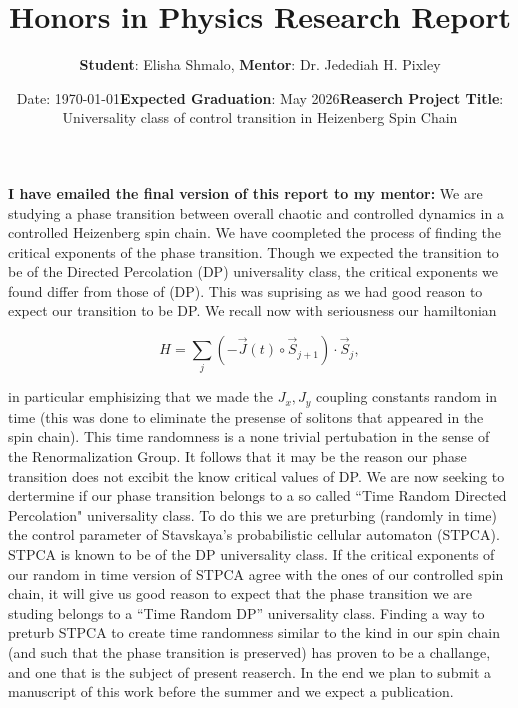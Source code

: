 \documentclass[12pt]{article}
\title{\textbf{Honors in Physics Research Report}}
\author{\textbf{Student}: Elisha Shmalo, \textbf{Mentor}: Dr. Jedediah H. Pixley}
\date{Date: \today}
\date{\textbf{Expected Graduation}: May 2026}
\date{\textbf{Reaserch Project Title}: Universality class of control transition in Heizenberg Spin Chain}
\numberwithin{equation}{section}
\begin{document}
\maketitle

\textbf{I have emailed the final version of this report to my mentor:} We are studying a phase transition between overall 
chaotic and controlled dynamics in a controlled Heizenberg spin chain. We have coompleted the process of 
finding the critical exponents of the phase transition. Though we expected the transition to be of the Directed Percolation (DP)
universality class, the critical exponents we found differ from those of (DP). This was suprising as we had 
good reason to expect our transition to be DP. We recall now with seriousness our hamiltonian

\begin{equation}
    H = \sum_j (-\vec{J}(t) \circ \vec{S}_{j+1}) \cdot \vec{S}_j,
\end{equation}

in particular emphisizing that we made the $J_x, J_y$ coupling constants random in time (this was done to eliminate the 
presense of solitons that appeared in the spin chain). This time randomness is a none trivial pertubation in the 
sense of the Renormalization Group. It follows that it may be the reason our phase transition does not excibit the 
know critical values of DP. We are now seeking to dertermine 
if our phase transition belongs to a so called ``Time Random Directed Percolation" universality class. To do this we are 
preturbing (randomly in time) the control parameter of Stavskaya's probabilistic cellular automaton (STPCA). STPCA is known to 
be of the DP universality class. If the critical exponents of our random in time version of STPCA agree with the ones of 
our controlled spin chain, it will give us good reason to expect that the phase transition we are studing belongs to a 
``Time Random DP'' universality class. Finding a way to preturb STPCA to create time randomness similar to the kind in 
our spin chain (and such that the phase transition is preserved) has proven to be a challange, and one that is the subject of present reaserch.
In the end we plan to submit a manuscript of this work before the summer and we expect a publication.
\end{document}
